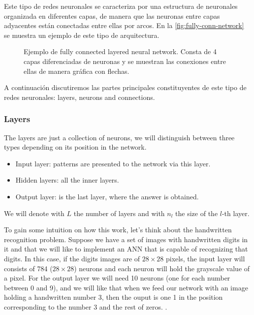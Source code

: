 Este tipo de redes neuronales se caracteriza por una estructura de neuronales
organizada en diferentes capas, de manera que las neuronas entre capas
adyacentes están conectadas entre ellas por arcos. En la
\vref{fig:fully-conn-network} se muestra un ejemplo de este tipo de
arquitectura.

\begin{figure}[ht]
  \centering
  
  \caption[Fully Connected Neural Network topology]{Ejemplo de fully connected
    layered neural network. Consta de 4 capas diferenciadas de neuronas y se
    muestran las conexiones entre ellas de manera gráfica con flechas.}
  \label{fig:fully-conn-network}
\end{figure}

A continuación discutiremos las partes principales constituyentes de este tipo
de redes neuronales: layers, neurons and connections.

\subsubsection{Layers}
The layers are just a collection of neurons, we will distinguish between three
types depending on its position in the network.

\begin{itemize}
  \item Input layer: patterns are presented to the network via this layer.
  \item Hidden layers: all the inner layers.
  \item Output layer: is the last layer, where the answer is obtained.
\end{itemize}

We will denote with \(L\) the number of layers and with \(n_l\) the size of the
\(l\)-th layer.

To gain some intuition on how this work, let's think about the handwritten
recognition problem. Suppose we have a set of images with handwritten digits in
it and that we will like to implement an ANN that is capable of recognizing
that digits. In this case, if the digits images are of \(28 \times 28\) pixels,
the input layer will consists of 784 (\(28 \times 28\)) neurons and each neuron
will hold the grayscale value of a pixel. For the output layer we will need 10
neurons (one for each number between 0 and 9), and we will like that when we
feed our network with an image holding a handwritten number 3, then the ouput
is one 1 in the position corresponding to the number 3 and the rest of zeros.
.

